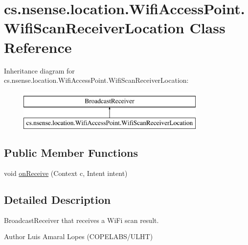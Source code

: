 \hypertarget{classcs_1_1nsense_1_1location_1_1_wifi_access_point_1_1_wifi_scan_receiver_location}{\section{cs.\-nsense.\-location.\-Wifi\-Access\-Point.\-Wifi\-Scan\-Receiver\-Location Class Reference}
\label{classcs_1_1nsense_1_1location_1_1_wifi_access_point_1_1_wifi_scan_receiver_location}
}
Inheritance diagram for cs.\-nsense.\-location.\-Wifi\-Access\-Point.\-Wifi\-Scan\-Receiver\-Location\-:\begin{figure}[H]
\begin{center}
\leavevmode
\includegraphics[height=2.000000cm]{classcs_1_1nsense_1_1location_1_1_wifi_access_point_1_1_wifi_scan_receiver_location}
\end{center}
\end{figure}
\subsection*{Public Member Functions}
\begin{DoxyCompactItemize}
\item 
void \hyperlink{classcs_1_1nsense_1_1location_1_1_wifi_access_point_1_1_wifi_scan_receiver_location_a1b260e0d4524aa8cf180e019d8f18207}{on\-Receive} (Context c, Intent intent)
\end{DoxyCompactItemize}


\subsection{Detailed Description}
Broadcast\-Receiver that receives a Wi\-Fi scan result. \begin{DoxyAuthor}{Author}
Luis Amaral Lopes (C\-O\-P\-E\-L\-A\-B\-S/\-U\-L\-H\-T) 
\end{DoxyAuthor}



